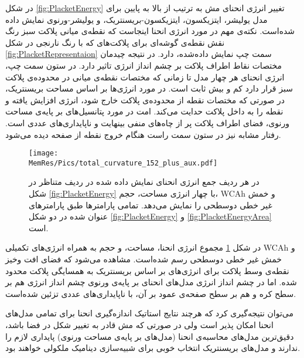 در شکل
\ref{fig:PlacketEnergy}
تغییر انرژی انحنای مش به ترتیب از بالا به پایین برای مدل یولیشر، ایتزیکسون، ایتزیکسون-بریسنتریک، و یولیشر-ورنوی نمایش داده شده‌است. نکته‌ی مهم در مورد انرژی انحنا اینجاست که نقطه‌ی میانی پلاکت سبز رنگ نقش نقطه‌ی گوشه‌ای برای پلاکت‌های که با رنگ نارنجی در شکل
\ref{fig:PlacketRepresentaion}
سمت چپ نمایش داده‌شده، دارد. در نتیجه چیدمان مختصات نقاط اطراف پلاکت بر چشم انداز انرژی تاثیر دارد. در ستون سمت چپ، انرژی انحنای هر چهار مدل تا زمانی که مختصات نقطه‌ی میانی در محدود‌ه‌ی پلاکت سبز قرار دارد کم و بیش ثابت است. در مورد انرژی‌ها بر اساس مساحت بریسنتریک، در صورتی که مختصات نقطه از محدوده‌ی پلاکت خارج شود، انرژی افزایش یافته و نقطه را به داخل پلاکت حدایت می‌کند. امت در مورد پتانسیل‌های بر پایه‌ی مساحت ورنوی، فضای اطراف پلاکت پر از چاه‌های منفی بینهایت و ناپایداری‌های عددی‌ است. رفتار مشابه نیز در ستون سمت راست هنگام خروج نقطه از صفحه دیده می‌شود. 


\begin{figure}[htbp]
\begin{center}
\texttt{[image: \\MemRes/Pics/total\_curvature\_152\_plus\_aux.pdf]}
\caption{
در هر ردیف جمع انرژی انحنای نمایش داده شده در ردیف متناظر در  شکل
\ref{fig:PlacketEnergy}
با چهار انرژی مساحت، حجم، 
WCAh
و خمش غیر خطی دوسطحی را نمایش می‌دهد. تمامی‌ پارامتر‌ها طبق پارامتر‌های عنوان شده در دو شکل 
\ref{fig:PlacketEnergy}
و
\ref{fig:PlacketEnergyArea}
است. 
}
\label{fig:PlacketEnergyAll}
\end{center}
\end{figure}


در شکل 
\ref{fig:PlacketEnergyAll}
مجموع انرژی انحنا، مساحت، و حجم به همراه انرژی‌های تکمیلی 
WCAh
و خمش غیر خطی دوسطحی رسم شده‌است. مشاهده می‌شود که فضای افت وخیز نقطه‌ی وسط پلاکت برای انرژی‌های بر اساس بریسنتریک به همسایگی پلاکت محدود شده. اما در چشم انداز انرژی مدل‌های انحنای بر پایه‌ی ورنوی چشم انداز انرژی هم بر سطح کره و هم بر سطح صفحه‌ی عمود بر آن، با ناپایداری‌های عددی تزئین شده‌است. 

می‌توان نتیجه‌گیری کرد که هرچند نتایج استاتیک اندازه‌گیری انحنا برای تمامی‌ مدل‌های انحنا امکان پذیر است ولی در صورتی که مش قادر به تغییر شکل در فضا باشد، دقیق‌ترین مدل‌های محاسبه‌ی انحنا (مدل‌های بر پایه‌ی مساحت ورنوی) پایداری لازم را ندارند و مدل‌های بریسنتریک انتخاب خوبی برای شبیه‌سازی دینامیک ملکولی خواهند بود.


